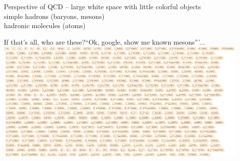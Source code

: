 \documentclass[aspectratio=169]{beamer}
\begin{document}
\begin{frame}[plain]{}{}%
\centering
\vspace{5mm}%
Perspective of QCD -- large white space with little colorful objects
\\\vspace{1cm}%
simple hadrons (baryons, mesons)\qquad
{} \qquad
{} \qquad
{}
\\\vspace{1cm}
hadronic molecules (atoms)\qquad
{}\qquad{\Huge \dots\dots}
\end{frame}


\begin{frame}{If that's all, who are these?}{``Ok, google, show me known mesons'''...}
    \pause
    \includegraphics[width=0.95\textwidth]{figs/mesons-e.png}
\end{frame}

\newcommand{\baryon}[4]{
\begin{tikzpicture}[node distance=0.9cm and 1.3cm, baseline=-1cm]
  \node[coordinate] (a) at (-1,0) {};
  \filldraw[even odd rule,inner color=cola,outer color=white] (a) circle (1cm);
  \draw[black,thick] (a) circle (1cm);
  \draw[black] (a) ++(0.3,0.3) circle (3mm) node[] {#3};
  \draw[black] (a) ++(-0.4,0.1) circle (3mm) node[] {#2};
  \filldraw[even odd rule,inner color=quark,outer color=white] (a) ++(0,-0.5) circle (3mm);
  \draw[black, thick] (a) ++(0,-0.5) circle (3mm) node[] {#1};
  \draw[black] (a) ++(-1,-1) node[] {#4};
\end{tikzpicture}
}
\end{document}
